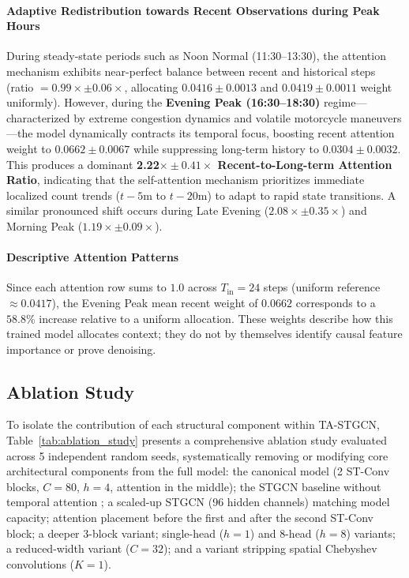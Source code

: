 \documentclass[preprint,12pt]{elsarticle}
\begin{document}
\paragraph{Adaptive Redistribution towards Recent Observations during Peak Hours} During steady-state periods such as Noon Normal (11:30--13:30), the attention mechanism exhibits near-perfect balance between recent and historical steps (ratio $= 0.99\times \pm 0.06\times$, allocating $0.0416 \pm 0.0013$ and $0.0419 \pm 0.0011$ weight uniformly). However, during the \textbf{Evening Peak (16:30--18:30)} regime---characterized by extreme congestion dynamics and volatile motorcycle maneuvers---the model dynamically contracts its temporal focus, boosting recent attention weight to $0.0662 \pm 0.0067$ while suppressing long-term history to $0.0304 \pm 0.0032$. This produces a dominant \textbf{2.22$\times \pm 0.41\times$ Recent-to-Long-term Attention Ratio}, indicating that the self-attention mechanism prioritizes immediate localized count trends ($t-5\text{m}$ to $t-20\text{m}$) to adapt to rapid state transitions. A similar pronounced shift occurs during Late Evening ($2.08\times \pm 0.35\times$) and Morning Peak ($1.19\times \pm 0.09\times$).

\paragraph{Descriptive Attention Patterns} Since each attention row sums to $1.0$ across $T_{\text{in}} = 24$ steps (uniform reference $\approx 0.0417$), the Evening Peak mean recent weight of $0.0662$ corresponds to a $58.8\%$ increase relative to a uniform allocation. These weights describe how this trained model allocates context; they do not by themselves identify causal feature importance or prove denoising.

\subsection{Ablation Study}

To isolate the contribution of each structural component within TA-STGCN, Table~\ref{tab:ablation_study} presents a comprehensive ablation study evaluated across 5 independent random seeds, systematically removing or modifying core architectural components from the full model: the canonical model (2 ST-Conv blocks, $C=80$, $h=4$, attention in the middle); the STGCN baseline without temporal attention \citep{stgcn}; a scaled-up STGCN (96 hidden channels) matching model capacity; attention placement before the first and after the second ST-Conv block; a deeper 3-block variant; single-head ($h=1$) and 8-head ($h=8$) variants; a reduced-width variant ($C=32$); and a variant stripping spatial Chebyshev convolutions ($K=1$).
\end{document}
